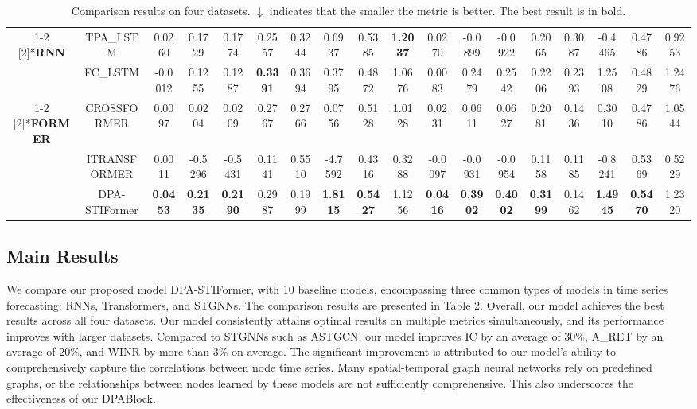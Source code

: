 \begin{table*}[htbp]
{{\begin{tabular}{cc|cccccccc|cccccccc}
\cmidrule{1-2}    \multirow{2}[2]{*}{\textbf{RNN}} & TPA\_LSTM & 0.0260  & 0.1729  & 0.1774  & 0.2557  & 0.3244  & 0.6937  & 0.5385  & \textbf{1.2037 } & 0.0270  & -0.0899  & -0.0922  & 0.2065  & 0.3087  & -0.4465  & 0.4786  & 0.9253  \\
          & FC\_LSTM & -0.0012  & 0.1255  & 0.1287  & \textbf{0.3391 } & 0.3694  & 0.3795  & 0.4872  & 1.0676  & 0.0083  & 0.2479  & 0.2542  & 0.2206  & 0.2393  & 1.2508  & 0.4829  & 1.2476  \\
\cmidrule{1-2}    \multirow{2}[2]{*}{\textbf{FORMER}} & CROSSFORMER & 0.0097  & 0.0204  & 0.0209  & 0.2767  & 0.2766  & 0.0756  & 0.5128  & 1.0128  & 0.0231  & 0.0611  & 0.0627  & 0.2081  & 0.1436  & 0.3010  & 0.4786  & 1.0544  \\
          & ITRANSFORMER & 0.0011  & -0.5296  & -0.5431  & 0.1141  & 0.5510  & -4.7592  & 0.4316  & 0.3288  & -0.0097  & -0.0931  & -0.0954  & 0.1158  & 0.1185  & -0.8241  & 0.5369  & 0.5229  \\
    \midrule
          & DPA-STIFormer    & \textbf{0.0453 } & \textbf{0.2135 } & \textbf{0.2190 } & 0.2987  & 0.1999  & \textbf{1.8115 } & \textbf{0.5427 } & 1.1256  & \textbf{0.0416 } & \textbf{0.3902 } & \textbf{0.4002 } & \textbf{0.3199 } & 0.1462  & \textbf{1.4945 } & \textbf{0.5470 } & 1.2320  \\
    \bottomrule
    \end{tabular}%
    }
  }
  \label{tab:main}%
    \caption{Comparison results on four datasets. $\downarrow$ indicates that the smaller the metric is better. The best result is in bold.}
\end{table*}%

\subsection{Main Results}
We compare our proposed model DPA-STIFormer, with 10 baseline models, encompassing three common types of models in time series forecasting: RNNs, Transformers, and STGNNs. The comparison results are presented in Table 2. Overall, our model achieves the best results across all four datasets. Our model consistently attains optimal results on multiple metrics simultaneously, and its performance improves with larger datasets. Compared to STGNNs such as ASTGCN, our model improves IC by an average of 30\%, A\_RET by an average of 20\%, and WINR by more than 3\% on average. The significant improvement is attributed to our model's ability to comprehensively capture the correlations between node time series. Many spatial-temporal graph neural networks rely on predefined graphs, or the relationships between nodes learned by these models are not sufficiently comprehensive. This also underscores the effectiveness of our DPABlock.

